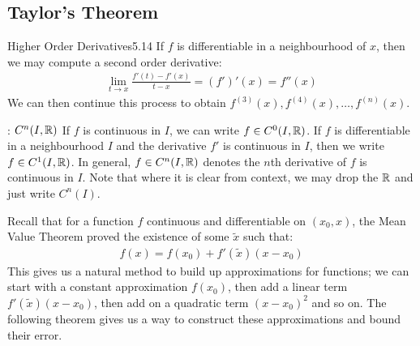 \subsection{Taylor's Theorem}
\setcounter{rudin}{13}
\begin{definition}{Higher Order Derivatives}{5.14}
If $f$ is differentiable in a neighbourhood of $x$, then we may compute a second order derivative:
\begin{align*}
    \lim_{t \rightarrow x} \frac{f'(t) - f'(x)}{t - x} = (f')'(x) = f''(x)
\end{align*}
We can then continue this process to obtain $f^{(3)}(x), f^{(4)}(x), \ldots, f^{(n)}(x)$. 
\end{definition}
\begin{ndef}{: \texorpdfstring{$C^n(I, \mathbb{R})$}{Cn(I, R)}}{}
    If $f$ is continuous in $I$, we can write $f \in C^{0}(I, \mathbb{R})$. If $f$ is differentiable in a neighbourhood $I$ and the derivative $f'$ is continuous in $I$, then we write $f \in C^{1}(I, \mathbb{R})$. In general, $f \in C^{n}(I, \mathbb{R})$ denotes the $n$th derivative of $f$ is continuous in $I$. Note that where it is clear from context, we may drop the $\mathbb{R}$ and just write $C^n(I)$. 
\end{ndef}
\noindent Recall that for a function $f$ continuous and differentiable on $(x_0, x)$, the Mean Value Theorem proved the existence of some $\tilde{x}$ such that:
\begin{align*}
    f(x) = f(x_0) + f'(\tilde{x})(x - x_0)
\end{align*}
This gives us a natural method to build up approximations for functions; we can start with a constant approximation $f(x_0)$, then add a linear term $f'(\tilde{x})(x - x_0)$, then add on a quadratic term $(x - x_0)^2$ and so on. The following theorem gives us a way to construct these approximations and bound their error.

